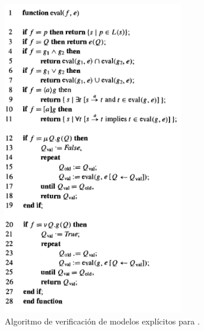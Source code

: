 \begin{figure}[h!]
  \centering
  \includegraphics[width=0.7\textwidth]{Figures/eval.png}
  \caption{Algoritmo de verificación de modelos explícitos para {\mucalculo} \cite{Clarke:1}.} 
  \label{fig:eval1}
\end{figure}
